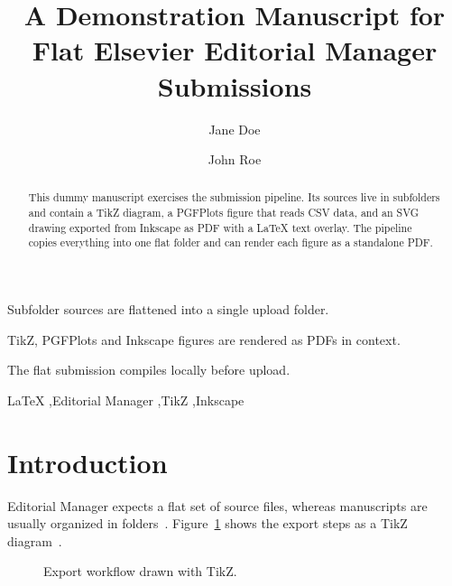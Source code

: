 \documentclass[a4paper,fleqn]{cas-dc}
\begin{document}

\title[mode = title]{A Demonstration Manuscript for Flat Elsevier Editorial Manager Submissions}

\author[1]{Jane Doe}
\cormark[1]

\author[1]{John Roe}



\begin{abstract}
This dummy manuscript exercises the submission pipeline. Its sources live in subfolders and contain a TikZ diagram, a PGFPlots figure that reads CSV data, and an SVG drawing exported from Inkscape as PDF with a \LaTeX{} text overlay. The pipeline copies everything into one flat folder and can render each figure as a standalone PDF.
\end{abstract}

\begin{highlights}
\item Subfolder sources are flattened into a single upload folder.
\item TikZ, PGFPlots and Inkscape figures are rendered as PDFs in context.
\item The flat submission compiles locally before upload.
\end{highlights}

\begin{keywords}
\LaTeX{} \sep Editorial Manager \sep TikZ \sep Inkscape
\end{keywords}

\maketitle

\section{Introduction}

Editorial Manager expects a flat set of source files, whereas manuscripts are usually organized in folders~\citep{knuth1986texbook}. Figure~\ref{fig:workflow} shows the export steps as a TikZ diagram~\citep{tantau2023tikz}.

\begin{figure}[t]
\centering
\resizebox{\columnwidth}{!}{}
\caption{Export workflow drawn with TikZ.}
\label{fig:workflow}
\end{figure}
\end{document}
